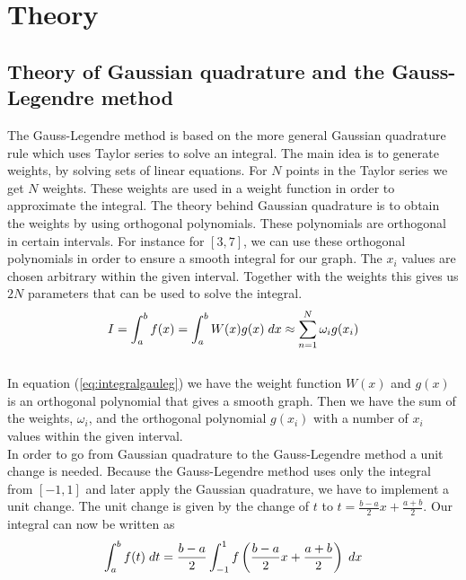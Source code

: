 \documentclass{article}
\begin{document}
\section{Theory} \label{sec:Theory}

\subsection{Theory of Gaussian quadrature and the Gauss-Legendre method}

The Gauss-Legendre method is based on the more general Gaussian quadrature rule which uses Taylor series to solve an integral. The main idea is to generate weights, by solving sets of linear equations. For $N$ points in the Taylor series we get $N$ weights. These weights are used in a weight function in order to approximate the integral. The theory behind Gaussian quadrature is to obtain the weights by using orthogonal polynomials. These polynomials are orthogonal in certain intervals. For instance for $[3,7]$, we can use these orthogonal polynomials in order to ensure a smooth integral for our graph. The $x_i$ values are chosen arbitrary within the given interval. Together with the weights this gives us $2N$ parameters that can be used to solve the integral. \\

\begin{equation} \label{eq:integralgauleg}
    I = \int_{a}^{b} f(x) = \int_{a}^{b}W(x)g(x) \hspace{1mm} dx \approx  \sum_{n=1}^{N}  \omega_i g(x_i)
\end{equation} \\

In equation (\ref{eq:integralgauleg}) we have the weight function $W(x)$ and $g(x)$ is an orthogonal polynomial that gives a smooth graph. Then we have the sum of the weights, $\omega_i$, and the orthogonal polynomial $g(x_i)$ with a number of $x_i$ values within the given interval. \\

In order to go from Gaussian quadrature to the Gauss-Legendre method a unit change is needed. Because the Gauss-Legendre method uses only the integral from $[-1,1]$ and later apply the Gaussian quadrature, we have to implement a unit change. The unit change is given by the change of $t$ to $t = \frac{b-a}{2}x + \frac{a+b}{2}$. Our integral can now be written as \\

\begin{equation} \label{eq:tchangeintegralgauleg}
    \int_{a}^{b} f(t) \hspace{1mm} dt = \frac{b-a}{2}\int_{-1}^{1} f \left( \frac{b-a}{2}x + \frac{a+b}{2} \right) \hspace{1mm} dx
\end{equation} \\
\end{document}
